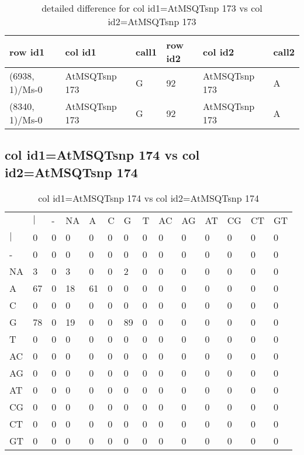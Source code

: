 \begin{center}
\begin{longtable}{|l|l|l|l|l|l|}
\caption{detailed difference for col id1=AtMSQTsnp 173 vs col id2=AtMSQTsnp 173} \label{table_dm741}\\
\hline
row id1&col id1&call1&row id2&col id2&call2\\
\hline
(6938, 1)/Ms-0&AtMSQTsnp 173&G&92&AtMSQTsnp 173&A\\
(8340, 1)/Ms-0&AtMSQTsnp 173&G&92&AtMSQTsnp 173&A\\
\hline
\end{longtable}
\end{center}

\subsection{col id1=AtMSQTsnp 174 vs col id2=AtMSQTsnp 174}
\begin{center}
\begin{longtable}{|l|l|l|l|l|l|l|l|l|l|l|l|l|l|}
\caption{col id1=AtMSQTsnp 174 vs col id2=AtMSQTsnp 174} \label{table_dm742}\\
\hline
\\
\hline
&$|$&-&NA&A&C&G&T&AC&AG&AT&CG&CT&GT\\
$|$&0&0&0&0&0&0&0&0&0&0&0&0&0\\
-&0&0&0&0&0&0&0&0&0&0&0&0&0\\
NA&3&0&3&0&0&2&0&0&0&0&0&0&0\\
A&67&0&18&61&0&0&0&0&0&0&0&0&0\\
C&0&0&0&0&0&0&0&0&0&0&0&0&0\\
G&78&0&19&0&0&89&0&0&0&0&0&0&0\\
T&0&0&0&0&0&0&0&0&0&0&0&0&0\\
AC&0&0&0&0&0&0&0&0&0&0&0&0&0\\
AG&0&0&0&0&0&0&0&0&0&0&0&0&0\\
AT&0&0&0&0&0&0&0&0&0&0&0&0&0\\
CG&0&0&0&0&0&0&0&0&0&0&0&0&0\\
CT&0&0&0&0&0&0&0&0&0&0&0&0&0\\
GT&0&0&0&0&0&0&0&0&0&0&0&0&0\\
\hline
\end{longtable}
\end{center}

